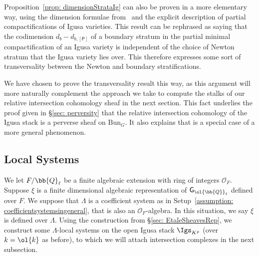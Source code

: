 \documentclass[letterpaper,11pt]{amsart}
\begin{document}
\begin{remark} Proposition~\ref{prop: dimensionStrataIg} can also be proven in a more elementary way, using the dimension formulae  from~\cite[\S 4.2-4.3]{CS17} and the explicit description of partial compactifications of Igusa varieties. This result can be rephrased as saying that the codimension $d_{b}-d_{b,[\mathsf{P}]}$ of a boundary stratum in the partial minimal compactification of an Igusa variety is independent of the choice of Newton stratum that the Igusa variety lies over. This therefore expresses some sort of transversality between the Newton and boundary stratifications. 

We have chosen to prove the transversality result this way, as this argument will more naturally complement the approach we take to compute the stalks of our relative intersection cohomology sheaf in the next section. This fact underlies the proof given in \S \ref{sec: perversity} that the relative intersection cohomology of the Igusa stack is a perverse sheaf on $\mathrm{Bun}_G$. It also explains that \cite[Proposition 9.23]{zhang2023} is a special case of a more general phenomenon.
\end{remark}

\subsection{Local Systems} \label{sec: EtaleLocalSys} We let $F/\bb{Q}_{\ell}$ be a finite algebraic extension with ring of integers $\mathcal{O}_{F}$. Suppose $\xi$ is a finite dimensional algebraic representation of $\mathsf{G}_{\ol{\bb{Q}}_{\ell}}$ defined over $F$. We suppose that $\Lambda$ is a coefficient system as in Setup~\ref{assumption: coefficientsystemsingeneral}, that is also an $\mathcal{O}_{F}$-algebra. In this situation, we say $\xi$ is defined over $\Lambda$. Using the construction from \S\ref{sec: EtaleSheavesRep}, we construct some $\Lambda$-local systems on the open Igusa stack $\Igs_{K^p}$ (over $k=\ol{k}$ as before), to which we will attach intersection complexes in the next subsection. 
\end{document}
